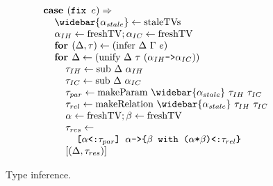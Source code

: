 \documentclass[acmsmall]{acmart}
\begin{document}
\begin{figure*}[h]
\[\begin{array}[t]{@{} l}
    \\

    \I \B{case } (\code{fix $e$}) \Rightarrow  
    \\
    \I\I \widebar{\alpha_{stale}} \leftarrow \F{staleTVs}
    \\
    \I\I \alpha_{IH} \leftarrow \F{freshTV}; \alpha_{IC} \leftarrow \F{freshTV}
    \\
    \I\I \B{for } (\Delta, \tau) \leftarrow (\F{infer}\ \Delta\ \Gamma\ e) 
    \\
    \I\I \B{for } \Delta \leftarrow (\F{unify}\ \Delta\ \tau\ (\code{$\alpha_{IH}$->$\alpha_{IC}$})) 
    \\
    \I\I\I \tau_{IH} \leftarrow \F{sub}\ \Delta\ \alpha_{IH}  
    \\
    \I\I\I \tau_{IC} \leftarrow \F{sub}\ \Delta\ \alpha_{IC}
    \\
    \I\I\I \tau_{par} \leftarrow \F{makeParam}\ \widebar{\alpha_{stale}}\ \tau_{IH}\ \tau_{IC}
    \\
    \I\I\I \tau_{rel} \leftarrow \F{makeRelation}\ \widebar{\alpha_{stale}}\ \tau_{IH}\ \tau_{IC}
    \\
    \I\I\I \alpha \leftarrow \F{freshTV}; \beta \leftarrow \F{freshTV}
    \\
    \I\I\I \tau_{res} \leftarrow
    \\
    \I\I\I\I \code{[$\alpha$<:$\tau_{par}$] $\alpha$->\{$\beta$ with ($\alpha$*$\beta$)<:$\tau_{rel}$\}}
    \\
    \I\I\I [(\Delta, \tau_{res})]

\end{array}
\]
\caption{Type inference.}
\end{figure*}
\end{document}
